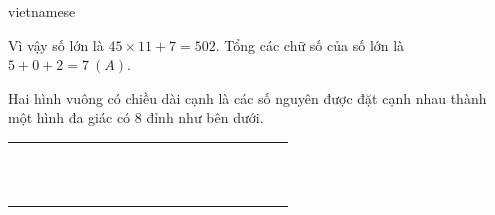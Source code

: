 \documentclass{article}
\begin{document}
\begin{otherlanguage*}{vietnamese}
\begin{soln}
    Vì vậy số lớn là $45 \times 11 + 7 = 502.$ 
    Tổng các chữ số của số lớn là $5 + 0 + 2 = \boxed{7\ (A).}$
\end{soln}

\bigbreak

\begin{problem*}[PI-2024-C-P6]
    \label{problem:pi-2024-c-p6}

    Hai hình vuông có chiều dài cạnh là các số nguyên được đặt cạnh nhau thành một hình đa giác có 8 đỉnh như bên dưới.

    \begin{center}
        \begin{tabular}{|llllllllllllllllllll}
            \cline{1-12}
             &  &  &  &  &  &  &  &  &  &  & \multicolumn{1}{l|}{} &  &  &  &  &  &  &  &                       \\
             &  &  &  &  &  &  &  &  &  &  & \multicolumn{1}{l|}{} &  &  &  &  &  &  &  &                       \\
             &  &  &  &  &  &  &  &  &  &  & \multicolumn{1}{l|}{} &  &  &  &  &  &  &  &                       \\ \cline{13-20} 
             &  &  &  &  &  &  &  &  &  &  &                       &  &  &  &  &  &  &  & \multicolumn{1}{l|}{} \\
             &  &  &  &  &  &  &  &  &  &  &                       &  &  &  &  &  &  &  & \multicolumn{1}{l|}{} \\
             &  &  &  &  &  &  &  &  &  &  &                       &  &  &  &  &  &  &  & \multicolumn{1}{l|}{} \\
             &  &  &  &  &  &  &  &  &  &  &                       &  &  &  &  &  &  &  & \multicolumn{1}{l|}{} \\
             &  &  &  &  &  &  &  &  &  &  &                       &  &  &  &  &  &  &  & \multicolumn{1}{l|}{} \\
             &  &  &  &  &  &  &  &  &  &  &                       &  &  &  &  &  &  &  & \multicolumn{1}{l|}{} \\
             &  &  &  &  &  &  &  &  &  &  &                       &  &  &  &  &  &  &  & \multicolumn{1}{l|}{} \\
             &  &  &  &  &  &  &  &  &  &  &                       &  &  &  &  &  &  &  & \multicolumn{1}{l|}{} \\ \cline{13-20} 
             &  &  &  &  &  &  &  &  &  &  & \multicolumn{1}{l|}{} &  &  &  &  &  &  &  &                       \\ \cline{1-12}
        \end{tabular}
    \end{center}


\end{problem*}
\end{otherlanguage*}
\end{document}
